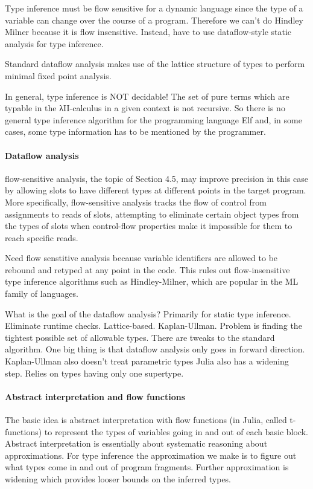 \documentclass[pldi]{sigplanconf-pldi15}
\begin{document}
Type inference must be flow sensitive for a dynamic language since the type of a variable can change over the course of a program. Therefore we can't do Hindley Milner because it is flow insensitive. Instead, have to use dataflow-style static analysis for type inference.

Standard dataflow analysis makes use of the lattice structure of types to perform minimal fixed point analysis.

In general, type inference is NOT decidable! The set of pure terms which are typable in the λII-calculus in a given context is not recursive. So there is no general type inference algorithm for the programming language Elf and, in some cases, some type information has to be mentioned by the programmer. 

\paragraph{Dataflow analysis}
 flow-sensitive analysis, the topic of Section 4.5,
may improve precision in this case by allowing slots to have different types at different points in the target program.
More specifically, flow-sensitive analysis tracks the flow of control from assignments to reads of slots, attempting to
eliminate certain object types from the types of slots when control-flow properties make it impossible for them to
reach specific reads.

Need flow senstitive analysis because variable identifiers are allowed to be rebound and retyped at any point in the code. This rules out flow-insensitive type inference algorithms such as Hindley-Milner, which are popular in the ML family of languages.

What is the goal of the dataflow analysis? Primarily for static type inference. Eliminate runtime checks. Lattice-based. Kaplan-Ullman.
Problem is finding the tightest possible set of allowable types.
There are tweaks to the standard algorithm. One big thing is that dataflow analysis only goes in forward direction.
Kaplan-Ullman also doesn't treat parametric types
Julia also has a widening step.
Relies on types having only one supertype.





\paragraph{Abstract interpretation and flow functions}
The basic idea is abstract interpretation with flow functions (in Julia, called
t-functions) to represent the types of variables going in and out of each basic
block.  Abstract interpretation is essentially about systematic reasoning about
approximations. For type inference the approximation we make is to figure out
what types come in and out of program fragments. Further approximation is
widening which provides looser bounds on the inferred types. 
\end{document}
